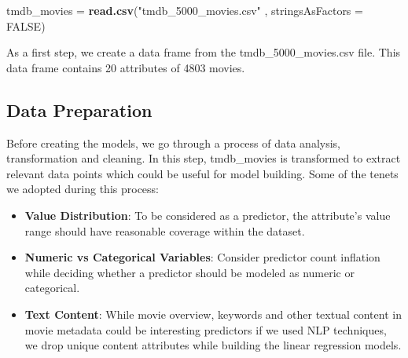 \documentclass[
]{article}
\newenvironment{Shaded}{\begin{snugshade}}{\end{snugshade}}
\newcommand{\DataTypeTok}[1]{\textcolor[rgb]{0.13,0.29,0.53}{#1}}
\newcommand{\KeywordTok}[1]{\textcolor[rgb]{0.13,0.29,0.53}{\textbf{#1}}}
\newcommand{\NormalTok}[1]{#1}
\newcommand{\OtherTok}[1]{\textcolor[rgb]{0.56,0.35,0.01}{#1}}
\newcommand{\StringTok}[1]{\textcolor[rgb]{0.31,0.60,0.02}{#1}}
\providecommand{\tightlist}{%
  \setlength{\itemsep}{0pt}\setlength{\parskip}{0pt}}
\begin{document}
\begin{Shaded}
\begin{Highlighting}[]
\NormalTok{tmdb_movies =}\StringTok{ }\KeywordTok{read.csv}\NormalTok{(}\StringTok{"tmdb_5000_movies.csv"}\NormalTok{ , }\DataTypeTok{stringsAsFactors =} \OtherTok{FALSE}\NormalTok{)}
\end{Highlighting}
\end{Shaded}

As a first step, we create a data frame from the tmdb\_5000\_movies.csv
file. This data frame contains 20 attributes of 4803 movies.

\hypertarget{data-preparation}{%
\subsection{Data Preparation}\label{data-preparation}}

Before creating the models, we go through a process of data analysis,
transformation and cleaning. In this step, tmdb\_movies is transformed
to extract relevant data points which could be useful for model
building. Some of the tenets we adopted during this process:

\begin{itemize}
\tightlist
\item
  \textbf{Value Distribution}: To be considered as a predictor, the
  attribute's value range should have reasonable coverage within the
  dataset.
\item
  \textbf{Numeric vs Categorical Variables}: Consider predictor count
  inflation while deciding whether a predictor should be modeled as
  numeric or categorical.
\item
  \textbf{Text Content}: While movie overview, keywords and other
  textual content in movie metadata could be interesting predictors if
  we used NLP techniques, we drop unique content attributes while
  building the linear regression models.
\end{itemize}
\end{document}
